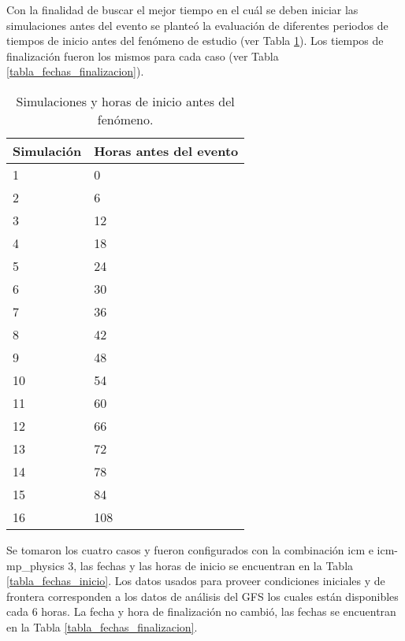 Con la finalidad de buscar el mejor tiempo en el cuál se deben iniciar las simulaciones antes del evento se planteó la evaluación de diferentes periodos de tiempos de inicio antes del fenómeno de estudio (ver Tabla \ref{tab_horas_inicio}). Los tiempos de finalización fueron los mismos para cada caso (ver Tabla \ref{tabla_fechas_finalizacion}).\\ 

\begin{table}[h]
\caption{Simulaciones y horas de inicio antes del fenómeno.}
\label{tab_horas_inicio}
\centering
\begin{tabular}{ll}
Simulación & Horas antes del evento \\ \hline
1 & 0 \\
2 & 6 \\
3 & 12 \\
4 & 18 \\
5 & 24 \\
6 & 30 \\
7 & 36 \\
8 & 42 \\
9 & 48 \\
10 & 54 \\
11 & 60 \\
12 & 66 \\
13 & 72 \\
14 & 78 \\
15 & 84 \\
16 & 108
\end{tabular}
\end{table}

Se tomaron los cuatro casos y fueron configurados con la combinación icm e icm-mp\_physics 3, las fechas y las horas de inicio se encuentran en la Tabla \ref{tabla_fechas_inicio}. Los datos usados para proveer condiciones iniciales y de frontera corresponden a los datos de análisis del GFS los cuales están disponibles cada 6 horas. La fecha y hora de finalización no cambió, las fechas se encuentran en la Tabla \ref{tabla_fechas_finalizacion}.

